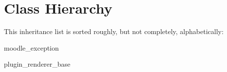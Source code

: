 \section{Class Hierarchy}
This inheritance list is sorted roughly, but not completely, alphabetically\-:\begin{DoxyCompactList}
\item {}
\item moodle\-\_\-exception\begin{DoxyCompactList}
\item {}
\end{DoxyCompactList}
\item plugin\-\_\-renderer\-\_\-base\begin{DoxyCompactList}
\item {}
\end{DoxyCompactList}
\end{DoxyCompactList}

